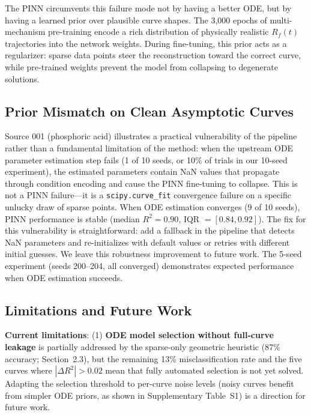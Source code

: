 \documentclass[review]{elsarticle}
\begin{document}
The PINN circumvents this failure mode not by having a better ODE, but by having a learned prior over plausible curve shapes. The 3,000 epochs of multi-mechanism pre-training encode a rich distribution of physically realistic $R_f(t)$ trajectories into the network weights. During fine-tuning, this prior acts as a regularizer: sparse data points steer the reconstruction toward the correct curve, while pre-trained weights prevent the model from collapsing to degenerate solutions.

\subsection{Prior Mismatch on Clean Asymptotic Curves}
\label{sec:prior_mismatch}

Source 001 (phosphoric acid) illustrates a practical vulnerability of the pipeline rather than a fundamental limitation of the method: when the upstream ODE parameter estimation step fails (1 of 10 seeds, or 10\% of trials in our 10-seed experiment), the estimated parameters contain NaN values that propagate through condition encoding and cause the PINN fine-tuning to collapse. This is not a PINN failure---it is a \texttt{scipy.curve\_fit} convergence failure on a specific unlucky draw of sparse points. When ODE estimation converges (9 of 10 seeds), PINN performance is stable (median $R^2 = 0.90$, IQR $= [0.84, 0.92]$). The fix for this vulnerability is straightforward: add a fallback in the pipeline that detects NaN parameters and re-initializes with default values or retries with different initial guesses. We leave this robustness improvement to future work. The 5-seed experiment (seeds 200--204, all converged) demonstrates expected performance when ODE estimation succeeds.

\subsection{Limitations and Future Work}

\textbf{Current limitations}: (1) \textbf{ODE model selection without full-curve leakage} is partially addressed by the sparse-only geometric heuristic (87\% accuracy; Section~2.3), but the remaining 13\% misclassification rate and the five curves where $|\Delta R^2| > 0.02$ mean that fully automated selection is not yet solved. Adapting the selection threshold to per-curve noise levels (noisy curves benefit from simpler ODE priors, as shown in Supplementary Table~S1) is a direction for future work.
\end{document}

